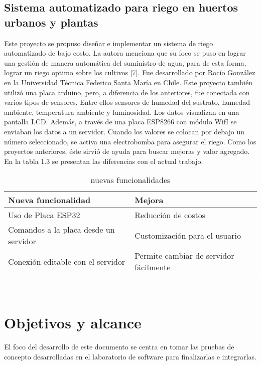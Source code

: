 \subsection{Sistema automatizado para riego en huertos urbanos y plantas}
Este proyecto se propuso diseñar e implementar un sistema de riego automatizado de bajo costo. La autora menciona que su foco se puso en lograr una gestión de manera automática del suministro de agua, para de esta forma, lograr un riego optimo sobre los cultivos [7]. Fue desarrollado por Rocío González en la Universidad Técnica Federico Santa María en Chile.
Este proyecto también utilizó una placa arduino, pero, a diferencia de los anteriores, fue conectada con varios tipos de sensores. Entre ellos sensores de humedad del sustrato, humedad ambiente, temperatura ambiente y luminosidad. Los datos visualizan en una pantalla LCD. Además, a través de una placa ESP8266 con módulo WifI se enviaban los datos a un servidor. Cuando los valores se colocan por debajo un número seleccionado, se activa una electrobomba para asegurar el riego. Como los proyectos anteriores, éste sirvió de ayuda para buscar mejoras y valor agregado. En la tabla 1.3 se presentan las diferencias con el actual trabajo.\\

\begin{table}[h]
	\centering
	\caption[Nuevas funcionalidades sobre el proyecto de Rocío González]{nuevas funcionalidades}
	\begin{tabular}{l l}    
		\toprule
		\textbf{Nueva funcionalidad} & \textbf{Mejora}\\	
		\midrule
		Uso de Placa ESP32           & Reducción de costos	\\		
		Comandos a la placa desde un servidor          & Customización para el usuario\\	
		Conexión editable con el servidor & Permite cambiar de servidor fácilmente\\	
		\bottomrule
		\hline
	\end{tabular}
	\label{tab:peces}\\
\end{table}


\section{Objetivos y alcance}
El foco del desarrollo de este documento  se centra en tomar las pruebas de concepto desarrolladas en el laboratorio de software para finalizarlas e integrarlas.

